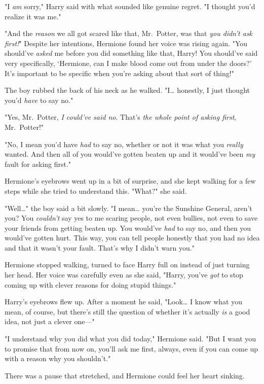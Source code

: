 "I \emph{am} sorry," Harry said with what sounded like genuine regret. "I
thought you'd realize it was me."

"And the \emph{reason} we all got scared like that, Mr.~Potter, was that
\emph{you didn't ask first!}" Despite her intentions, Hermione found her voice
was rising again. "You should've \emph{asked} me before you did something like
that, Harry! You should've said very specifically, `Hermione, can I make blood
come out from under the doors?' It's important to be specific when you're
asking about that sort of thing!"

The boy rubbed the back of his neck as he walked. "I{\ldots} honestly, I just
thought you'd \emph{have} to say no."

"Yes, Mr.~Potter, \emph{I could've said no}. That's \emph{the whole point of
asking first}, Mr.~Potter!"

"No, I mean you'd have \emph{had} to say no, whether or not it was what you
\emph{really} wanted. And then all of you would've gotten beaten up and it
would've been \emph{my} fault for asking first."

Hermione's eyebrows went up in a bit of surprise, and she kept walking for a
few steps while she tried to understand this. "What?" she said.

"Well{\ldots}" the boy said a bit slowly. "I mean{\ldots} you're the Sunshine
General, aren't you? You \emph{couldn't} say yes to me scaring people, not even
bullies, not even to save your friends from getting beaten up. You would've
\emph{had} to say no, and then you would've gotten hurt. This way, you can tell
people honestly that you had no idea and that it wasn't your fault. That's why
I didn't warn you."

Hermione stopped walking, turned to face Harry full on instead of just turning
her head. Her voice was carefully even as she said, "Harry, you've \emph{got}
to stop coming up with clever reasons for doing stupid things."

Harry's eyebrows flew up. After a moment he said, "Look{\ldots} I know what you
mean, of course, but there's still the question of whether it's actually
\emph{is} a good idea, not just a clever one---"

"I understand why you did what you did today," Hermione said. "But I want you
to promise that from now on, you'll ask me first, always, even if you can come
up with a reason why you shouldn't."

There was a pause that stretched, and Hermione could feel her heart sinking.

